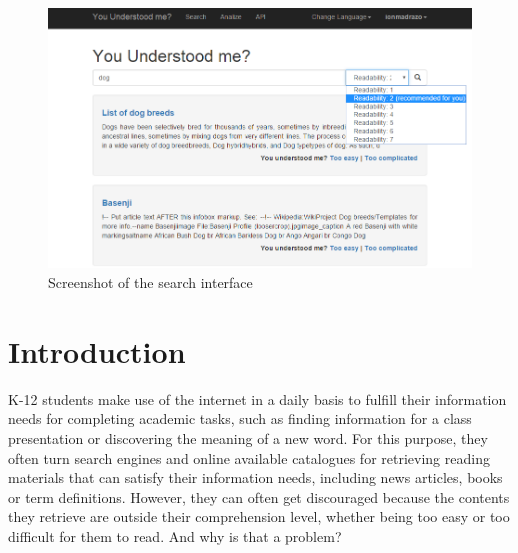 \documentclass{sig-alternate-05-2015}
\begin{document}





%
%

%
%
\printccsdesc


\\\\\\\\

\begin{figure}[h]
 \centering
  \includegraphics[width=1\textwidth]{SearchScreenshot2}
 \caption{Screenshot of the search interface}
 \end{figure}
\section{Introduction}

K-12 students make use of the internet in a daily basis to fulfill their information needs for completing academic tasks, such as finding information for a class presentation or discovering the meaning of a new word. For this purpose, they often turn search engines and online available catalogues for retrieving reading materials that can satisfy their information needs, including news articles, books or term definitions. However, they can often get discouraged because the contents they retrieve are outside their comprehension level, whether being too easy or too difficult  for them to read. {\color{red}And why is that a problem?}\\
\end{document}
